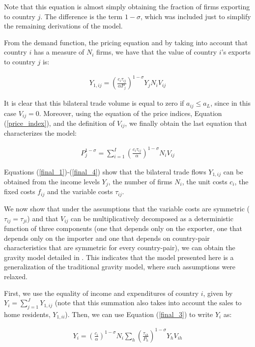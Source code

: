 Note that this equation is almost simply obtaining the fraction of firms exporting to country $j$. The difference is the term $1-\sigma$, which was included just to simplify the remaining derivations of the model. 

From the demand function, the pricing equation and by taking into account that country $i$ has a measure of $N_i$ firms, we have that the value of country $i$'s exports to country $j$ is:

\begin{align} \label{final_3}
    Y_{1,i j}=\left(\frac{c_{i} \tau_{i j}}{\alpha P_{j}}\right)^{1-\sigma} Y_{j} N_{i} V_{i j}
\end{align}

It is clear that this bilateral trade volume is equal to zero if $a_{ij} \leq a_L$, since in this case $V_{ij} = 0$.
Moreover, using the equation of the price indices, Equation (\ref{price_index}), and the definition of $V_{ij}$, we finally obtain the last equation that characterizes the model:

\begin{align} \label{final_4}
    P_{j}^{1-\sigma}=\sum_{i=1}^{I}\left(\frac{c_{i} \tau_{i j}}{\alpha}\right)^{1-\sigma} N_{i} V_{i j}
\end{align}

Equations (\ref{final_1})-(\ref{final_4}) show that the bilateral trade flows $Y_{1,ij}$ can be obtained from the income levels $Y_j$, the number of firms $N_i$, the unit costs $c_i$, the fixed costs $f_{ij}$ and the variable costs $\tau_{ij}$.

We now show that under the assumptions that the variable costs are symmetric ($\tau_{ij} = \tau_{ji}$) and that $V_{ij}$ can be multiplicatively decomposed as a deterministic function of three components (one that depends only on the exporter, one that depends only on the importer and one that depends on country-pair characteristics that are symmetric for every country-pair), we can obtain the gravity model detailed in \cite{anderson2003gravity}. This indicates that the model presented here is a generalization of the traditional gravity model, where such assumptions were relaxed.

First, we use the equality of income and expenditures of country $i$, given by $Y_i = \sum_{j=1}^J Y_{1,ij}$ (note that this summation also takes into account the sales to home residents, $Y_{1,ii}$). Then, we can use Equation (\ref{final_3}) to write $Y_i$ as:

\begin{align}  \label{implied1}
    Y_{i}=\left(\frac{c_{i}}{\alpha}\right)^{1-\sigma} N_{i} \sum_{h}\left(\frac{\tau_{i h}}{P_{h}}\right)^{1-\sigma} Y_{h} V_{i h}
\end{align}


